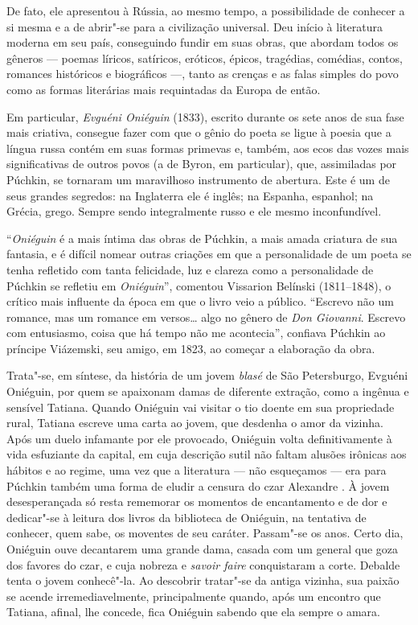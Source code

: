 De fato, ele apresentou à Rússia, ao mesmo tempo, a possibilidade de
conhecer a si mesma e a de abrir"-se para a civilização universal.
Deu início à literatura moderna em seu país, conseguindo fundir em suas obras, que abordam todos os gêneros --- poemas
líricos, satíricos, eróticos, épicos, tragédias, comédias, contos,
romances históricos e biográficos ---, tanto as crenças e as falas simples
do povo como as formas literárias mais requintadas da Europa de então.

Em particular, \emph{Evguéni Oniéguin} (1833), escrito durante os
sete anos de sua fase mais criativa, consegue fazer com que o gênio do poeta se ligue à poesia
que a língua russa contém em suas formas primevas e, também, aos ecos das
vozes mais significativas de outros povos (a de Byron, em particular),
que, assimiladas por Púchkin, se tornaram um maravilhoso instrumento de
abertura. Este é um de seus grandes segredos: na Inglaterra ele é
inglês; na Espanha, espanhol; na Grécia, grego. Sempre sendo
integralmente russo e ele mesmo inconfundível.

``\emph{Oniéguin} é a mais íntima das obras de Púchkin, a mais amada criatura de
sua fantasia, e é difícil nomear outras criações em que a personalidade
de um poeta se tenha refletido com tanta felicidade, luz e clareza como
a personalidade de Púchkin se refletiu em \emph{Oniéguin}'', comentou Vissarion Belínski (1811--1848), o crítico mais influente da época em que o livro veio a
público. ``Escrevo não um romance, mas um romance em versos\ldots{} algo no
gênero de \emph{Don Giovanni}. Escrevo com entusiasmo, coisa que há tempo não
me acontecia'', confiava Púchkin ao príncipe Viázemski, seu amigo, em
1823, ao começar a elaboração da obra.

Trata"-se, em síntese, da história de um jovem \emph{blasé} de São Petersburgo, Evguéni Oniéguin,
por quem se apaixonam damas de diferente extração, como a ingênua e sensível Tatiana. Quando Oniéguin vai visitar o tio doente em sua propriedade rural, Tatiana escreve uma carta ao jovem, que desdenha o amor da vizinha. Após um duelo infamante por ele
provocado, Oniéguin volta definitivamente à vida esfuziante da capital,
em cuja descrição sutil não faltam alusões irônicas aos hábitos e ao
regime, uma vez que a literatura --- não esqueçamos --- era para Púchkin
também uma forma de eludir a censura do czar Alexandre . À jovem
desesperançada só resta rememorar os momentos de encantamento e de dor e
dedicar"-se à leitura dos livros da biblioteca de Oniéguin, na tentativa
de conhecer, quem sabe, os moventes de seu caráter. Passam"-se os anos.
Certo dia, Oniéguin ouve decantarem uma grande dama, casada com um general
que goza dos favores do czar, e cuja nobreza e \emph{savoir faire} conquistaram
a corte. Debalde tenta o jovem conhecê"-la. Ao descobrir tratar"-se
da antiga vizinha, sua paixão se acende irremediavelmente, principalmente
quando, após um encontro que Tatiana, afinal, lhe concede, fica Oniéguin
sabendo que ela sempre o amara.

